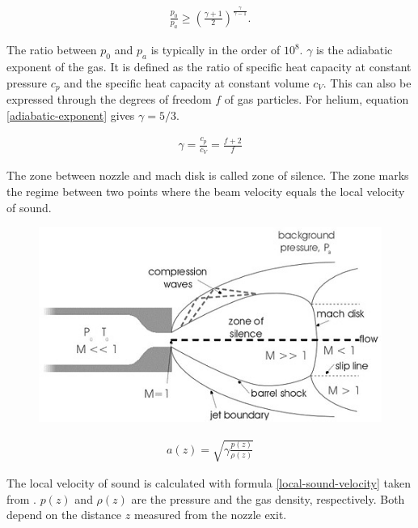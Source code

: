 \documentclass[parskip,12pt,headsepline,a4paper] {scrbook}
\begin{document}
\begin{align}  \label{pressure-condition}
\frac{p_0}{p_a} \geq \left(\frac{\gamma + 1}{2}\right)^{\frac{\gamma}{\gamma - 1}}.
\end{align}

The ratio between $p_0$ and $p_a$ is typically in the order of $10^8$. $\gamma$ is the adiabatic exponent of the gas. It is defined as the ratio of specific heat capacity at constant pressure $c_p$ and the specific heat capacity at constant volume $c_V$. This can also be expressed through the degrees of freedom $f$ of gas particles. For helium, equation \ref{adiabatic-exponent} gives $\gamma = 5/3$.

\begin{align}  \label{adiabatic-exponent}
\gamma = \frac{c_p}{c_V} = \frac{f+2}{f}
\end{align}

The zone between nozzle and mach disk is called zone of silence. The zone marks the regime between two points where the beam velocity equals the local velocity of sound.

\begin{figure}[ht]
\centerline{
\includegraphics[width=13cm]{./expansion/supersonic-expansion_sharp.jpg}}
\end{figure}

\begin{align}  \label{local-sound-velocity}
a(z) = \sqrt{\gamma \frac{p(z)}{\rho(z)}}
\end{align}

The local velocity of sound is calculated with formula \ref{local-sound-velocity} taken from \cite{scoles}. $p(z)$ and $\rho(z)$ are the pressure and the gas density, respectively. Both depend on the distance $z$ measured from the nozzle exit.
\end{document}

